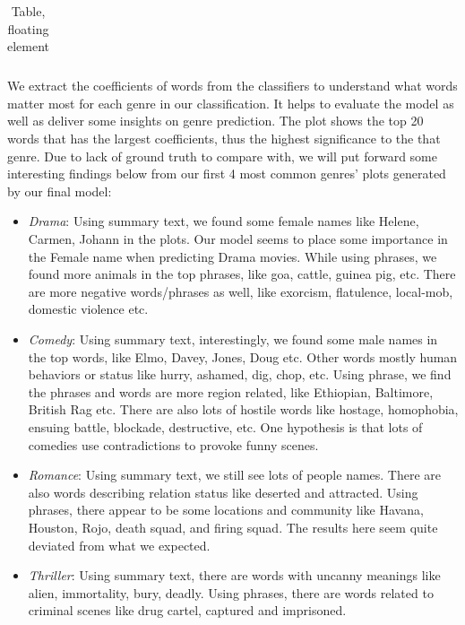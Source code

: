 \documentclass{article}
\begin{document}
\begin{multicols}{2}
\begin{table}
\begin{tabular}{|c|c|c|c|c}
\hline
\end{tabular}
\caption{Table, floating element}
\label{table:ta}
\end{table}

We extract the coefficients of words from the classifiers to understand what words matter most for each genre in our classification. It helps to evaluate the model as well as deliver some insights on genre prediction. The plot shows the top 20 words that has the largest coefficients, thus the highest significance to the that genre. Due to lack of ground truth to compare with, we will put forward some interesting findings below from our first 4 most common genres' plots generated by our final model:
\begin{itemize}
    \item  \textit{Drama}: Using summary text, we found some female names like Helene, Carmen, Johann in the plots. Our model seems to place some importance in the Female name when predicting Drama movies. While using phrases, we found more animals in the top phrases, like goa, cattle, guinea pig, etc. There are more negative words/phrases as well, like exorcism, flatulence, local-mob, domestic violence etc. 
    \item \textit{Comedy}: Using summary text, interestingly, we found some male names in the top words, like Elmo, Davey, Jones, Doug etc. Other words mostly human behaviors or status like hurry, ashamed, dig, chop, etc. Using phrase, we find the phrases and words are more region related, like Ethiopian, Baltimore, British Rag etc. There are also lots of hostile words like hostage, homophobia, ensuing battle, blockade, destructive, etc. One hypothesis is that lots of comedies use contradictions to provoke funny scenes. 
    \item \textit{Romance}: Using summary text, we still see lots of people names. There are also words describing relation status like deserted and attracted. Using phrases, there appear to be some locations and community like Havana, Houston, Rojo, death squad, and firing squad. The results here seem quite deviated from what we expected.
    \item \textit{Thriller}: Using summary text, there are words with uncanny meanings like alien, immortality, bury, deadly. Using phrases, there are words related to criminal scenes like drug cartel, captured and imprisoned.
\end{itemize}


\end{multicols}
\end{document}
